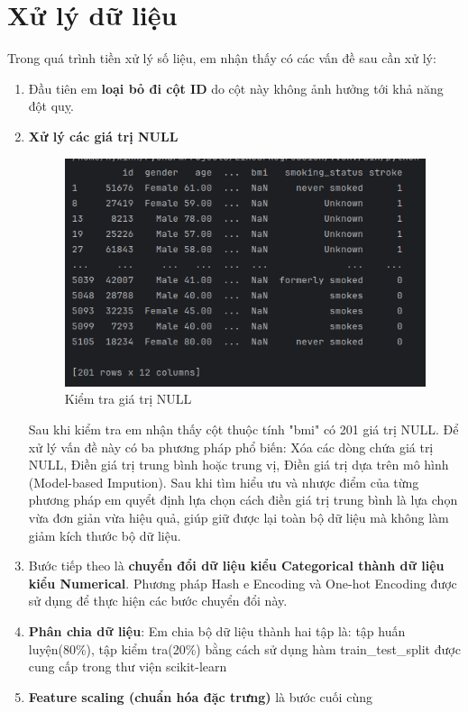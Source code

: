 \documentclass[11pt]{article}
\begin{document}
	\pagebreak
	
	\section{Xử lý dữ liệu}
	
	Trong quá trình tiền xử lý số liệu, em nhận thấy có các vấn đề sau cần xử lý:
	\begin{enumerate}
		\item Đầu tiên em \textbf{loại bỏ đi cột ID} do cột này không ảnh hưởng tới khả năng đột quỵ.
		\item
		\textbf{Xử lý các giá trị NULL}
		\begin{figure}[H]
			\centering
			\includegraphics[width=0.7\linewidth]{nullCheck}
			\caption{Kiểm tra giá trị NULL}
			\label{fig:nullcheck}
		\end{figure}
		Sau khi kiểm tra em nhận thấy cột thuộc tính "bmi" có 201 giá trị NULL. Để xử lý vấn đề này có ba phương pháp phổ biến: Xóa các dòng chứa giá trị NULL, Điền giá trị trung bình hoặc trung vị, Điền giá trị dựa trên mô hình (Model-based Impution).
		Sau khi tìm hiểu ưu và nhược điểm của từng phương pháp em quyểt định lựa chọn cách điền giá trị trung bình là lựa chọn vừa đơn giản vừa hiệu quả, giúp giữ được lại toàn bộ dữ liệu mà không làm giảm kích thước bộ dữ liệu.
		\item Bước tiếp theo là \textbf{chuyển đổi dữ liệu kiểu Categorical thành dữ liệu kiểu Numerical}. Phương pháp Hash e Encoding và One-hot Encoding được sử dụng để thực hiện các bước chuyển đổi này.
		\item \textbf{Phân chia dữ liệu}: Em chia bộ dữ liệu thành hai tập là: tập huấn luyện(80\%), tập kiểm tra(20\%) bằng cách sử dụng hàm train\_test\_split được cung cấp trong thư viện scikit-learn
		\item \textbf{Feature scaling (chuẩn hóa đặc trưng)} là bước cuối cùng
	\end{enumerate}
	\pagebreak
	
\end{document}
